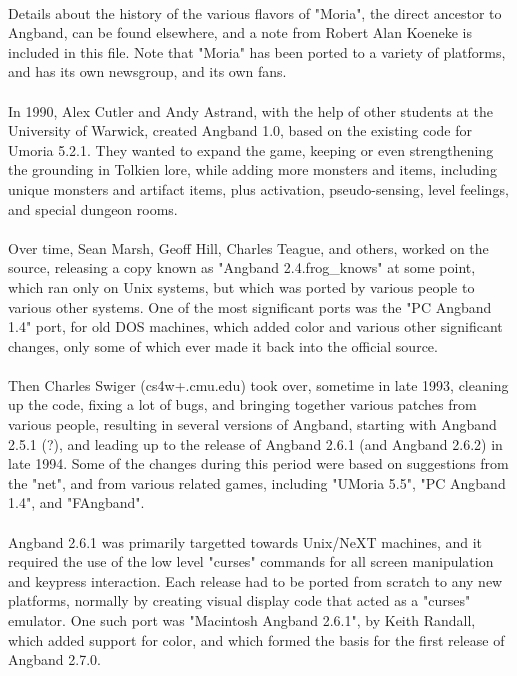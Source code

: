 \paragraph{}Details about the history of the various flavors of "Moria", the direct
ancestor to Angband, can be found elsewhere, and a note from Robert Alan
Koeneke is included in this file.  Note that "Moria" has been ported to
a variety of platforms, and has its own newsgroup, and its own fans.

\paragraph{}In 1990, Alex Cutler and Andy Astrand, with the help of other students
at the University of Warwick, created Angband 1.0, based on the existing
code for Umoria 5.2.1.  They wanted to expand the game, keeping or even
strengthening the grounding in Tolkien lore, while adding more monsters
and items, including unique monsters and artifact items, plus activation,
pseudo-sensing, level feelings, and special dungeon rooms.

\paragraph{}Over time, Sean Marsh, Geoff Hill, Charles Teague, and others, worked on
the source, releasing a copy known as "Angband 2.4.frog\_knows" at some
point, which ran only on Unix systems, but which was ported by various
people to various other systems.  One of the most significant ports was
the "PC Angband 1.4" port, for old DOS machines, which added color and
various other significant changes, only some of which ever made it back
into the official source.

\paragraph{}Then Charles Swiger (cs4w+\@andrew.cmu.edu) took over, sometime in late
1993, cleaning up the code, fixing a lot of bugs, and bringing together
various patches from various people, resulting in several versions of
Angband, starting with Angband 2.5.1 (?), and leading up to the release
of Angband 2.6.1 (and Angband 2.6.2) in late 1994.  Some of the changes
during this period were based on suggestions from the "net", and from
various related games, including "UMoria 5.5", "PC Angband 1.4", and
"FAngband".

\paragraph{}Angband 2.6.1 was primarily targetted towards Unix/NeXT machines, and
it required the use of the low level "curses" commands for all screen
manipulation and keypress interaction.  Each release had to be ported
from scratch to any new platforms, normally by creating visual display
code that acted as a "curses" emulator.  One such port was "Macintosh
Angband 2.6.1", by Keith Randall, which added support for color, and
which formed the basis for the first release of Angband 2.7.0.

